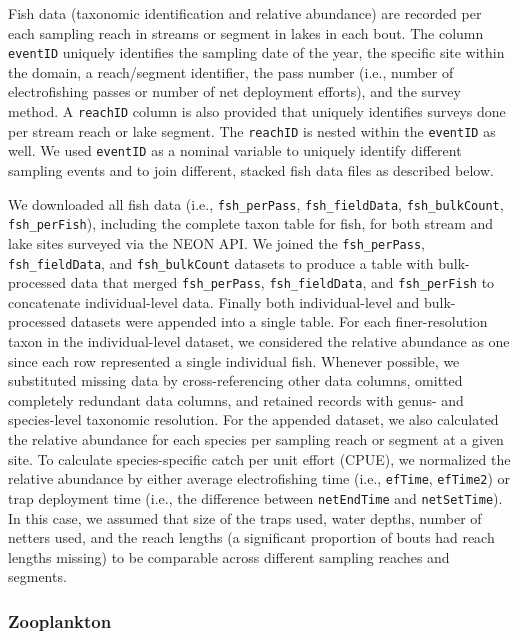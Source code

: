 \documentclass[
  12pt,
]{article}
\begin{document}
Fish data (taxonomic identification and relative abundance) are recorded per each sampling reach in streams or segment in lakes in each bout. The column \texttt{eventID} uniquely identifies the sampling date of the year, the specific site within the domain, a reach/segment identifier, the pass number (i.e., number of electrofishing passes or number of net deployment efforts), and the survey method. A \texttt{reachID} column is also provided that uniquely identifies surveys done per stream reach or lake segment. The \texttt{reachID} is nested within the \texttt{eventID} as well. We used \texttt{eventID} as a nominal variable to uniquely identify different sampling events and to join different, stacked fish data files as described below.

We downloaded all fish data (i.e., \texttt{fsh\_perPass}, \texttt{fsh\_fieldData}, \texttt{fsh\_bulkCount}, \texttt{fsh\_perFish}), including the complete taxon table for fish, for both stream and lake sites surveyed via the NEON API. We joined the \texttt{fsh\_perPass}, \texttt{fsh\_fieldData}, and \texttt{fsh\_bulkCount} datasets to produce a table with bulk-processed data that merged \texttt{fsh\_perPass}, \texttt{fsh\_fieldData}, and \texttt{fsh\_perFish} to concatenate individual-level data. Finally both individual-level and bulk-processed datasets were appended into a single table. For each finer-resolution taxon in the individual-level dataset, we considered the relative abundance as one since each row represented a single individual fish. Whenever possible, we substituted missing data by cross-referencing other data columns, omitted completely redundant data columns, and retained records with genus- and species-level taxonomic resolution. For the appended dataset, we also calculated the relative abundance for each species per sampling reach or segment at a given site. To calculate species-specific catch per unit effort (CPUE), we normalized the relative abundance by either average electrofishing time (i.e., \texttt{efTime}, \texttt{efTime2}) or trap deployment time (i.e., the difference between \texttt{netEndTime} and \texttt{netSetTime}). In this case, we assumed that size of the traps used, water depths, number of netters used, and the reach lengths (a significant proportion of bouts had reach lengths missing) to be comparable across different sampling reaches and segments.

\hypertarget{zooplankton}{%
\subsubsection{Zooplankton}\label{zooplankton}}
\end{document}
